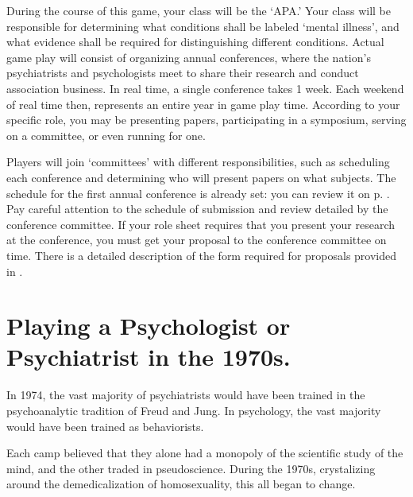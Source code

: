 \begin{refsection}
During the course of this game, your class will be the ‘APA.’ Your class will be responsible for determining what conditions shall be labeled ‘mental illness’, and what evidence shall be required for distinguishing different conditions. Actual game play will consist of organizing annual conferences, where the nation's psychiatrists and psychologists meet to share their research and conduct association business. In real time, a single conference takes 1 week. Each weekend of real time then, represents an entire year in game play time. According to your specific role, you may be presenting papers, participating in a symposium, serving on a committee, or even running for one.

Players will join ‘committees’ with different responsibilities, such as scheduling each conference and determining who will present papers on what subjects. The schedule for the first annual conference is already set: you can review it on p.  . Pay careful attention to the schedule of submission and review detailed by the conference committee. If your role sheet requires that you present your research at the conference, you must get your proposal to the conference committee on time. There is a detailed description of the form required for proposals provided in .

\section{Playing a Psychologist or Psychiatrist in the 1970s.}
\label{playingapsychologistorpsychiatristinthe1970s.}

In 1974, the vast majority of psychiatrists would have been trained in the psychoanalytic tradition of Freud and Jung. In psychology, the vast majority would have been trained as behaviorists.

Each camp believed that they alone had a monopoly of the scientific study of the mind, and the other traded in pseudoscience. During the 1970s, crystalizing around the demedicalization of homosexuality, this all began to change. 


\end{refsection}
